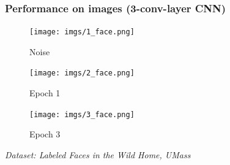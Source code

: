 \documentclass{beamer}
\begin{document}


\begin{frame}
\frametitle{Performance on images (3-conv-layer CNN)}
\begin{figure}[!htb]
  \texttt{[image: imgs/1\_face.png]}
  \caption*{Noise}\label{fig:awesome_image1}
\endminipage\hfill
{}
  \texttt{[image: imgs/2\_face.png]}
  \caption*{Epoch 1}\label{fig:awesome_image2}
\endminipage\hfill
{}%
  \texttt{[image: imgs/3\_face.png]}
  \caption*{Epoch 3}\label{fig:awesome_image3}
\endminipage
\end{figure}
\hspace{7cm}\tiny\emph{Dataset: Labeled Faces in the Wild Home, UMass}
\end{frame}






\end{document}

